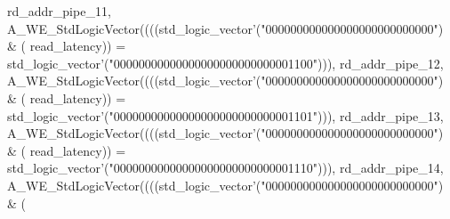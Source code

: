 \begin{DoxyCode}
{      rd_addr_pipe_11}\textcolor{vhdlchar}{,} \textcolor{vhdlchar}{A\_WE\_StdLogicVector}\textcolor{vhdlchar}{(}\textcolor{vhdlchar}{(}\textcolor{vhdlchar}{(}\textcolor{vhdlchar}{(}\textcolor{comment}{std\_logic\_vector}\textcolor{vhdlchar}{'}\textcolor{vhdlchar}{(}\textcolor{vhdllogic}{"000000000000000000000000000"}\textcolor{vhdlchar}{)} \textcolor{vhdlchar}{&} \textcolor{vhdlchar}{(}\textcolor{vhdlchar}{
      read_latency}\textcolor{vhdlchar}{)}\textcolor{vhdlchar}{)} \textcolor{vhdlchar}{=} \textcolor{comment}{std\_logic\_vector}\textcolor{vhdlchar}{'}\textcolor{vhdlchar}{(}\textcolor{vhdllogic}{"00000000000000000000000000001100"}\textcolor{vhdlchar}{)}\textcolor{vhdlchar}{)}\textcolor{vhdlchar}{)}\textcolor{vhdlchar}{,} \textcolor{vhdlchar}{
      rd_addr_pipe_12}\textcolor{vhdlchar}{,} \textcolor{vhdlchar}{A\_WE\_StdLogicVector}\textcolor{vhdlchar}{(}\textcolor{vhdlchar}{(}\textcolor{vhdlchar}{(}\textcolor{vhdlchar}{(}\textcolor{comment}{std\_logic\_vector}\textcolor{vhdlchar}{'}\textcolor{vhdlchar}{(}\textcolor{vhdllogic}{"000000000000000000000000000"}\textcolor{vhdlchar}{)} \textcolor{vhdlchar}{&} \textcolor{vhdlchar}{(}\textcolor{vhdlchar}{
      read_latency}\textcolor{vhdlchar}{)}\textcolor{vhdlchar}{)} \textcolor{vhdlchar}{=} \textcolor{comment}{std\_logic\_vector}\textcolor{vhdlchar}{'}\textcolor{vhdlchar}{(}\textcolor{vhdllogic}{"00000000000000000000000000001101"}\textcolor{vhdlchar}{)}\textcolor{vhdlchar}{)}\textcolor{vhdlchar}{)}\textcolor{vhdlchar}{,} \textcolor{vhdlchar}{
      rd_addr_pipe_13}\textcolor{vhdlchar}{,} \textcolor{vhdlchar}{A\_WE\_StdLogicVector}\textcolor{vhdlchar}{(}\textcolor{vhdlchar}{(}\textcolor{vhdlchar}{(}\textcolor{vhdlchar}{(}\textcolor{comment}{std\_logic\_vector}\textcolor{vhdlchar}{'}\textcolor{vhdlchar}{(}\textcolor{vhdllogic}{"000000000000000000000000000"}\textcolor{vhdlchar}{)} \textcolor{vhdlchar}{&} \textcolor{vhdlchar}{(}\textcolor{vhdlchar}{
      read_latency}\textcolor{vhdlchar}{)}\textcolor{vhdlchar}{)} \textcolor{vhdlchar}{=} \textcolor{comment}{std\_logic\_vector}\textcolor{vhdlchar}{'}\textcolor{vhdlchar}{(}\textcolor{vhdllogic}{"00000000000000000000000000001110"}\textcolor{vhdlchar}{)}\textcolor{vhdlchar}{)}\textcolor{vhdlchar}{)}\textcolor{vhdlchar}{,} \textcolor{vhdlchar}{
      rd_addr_pipe_14}\textcolor{vhdlchar}{,} \textcolor{vhdlchar}{A\_WE\_StdLogicVector}\textcolor{vhdlchar}{(}\textcolor{vhdlchar}{(}\textcolor{vhdlchar}{(}\textcolor{vhdlchar}{(}\textcolor{comment}{std\_logic\_vector}\textcolor{vhdlchar}{'}\textcolor{vhdlchar}{(}\textcolor{vhdllogic}{"000000000000000000000000000"}\textcolor{vhdlchar}{)} \textcolor{vhdlchar}{&} \textcolor{vhdlchar}{(}\textcolor{vhdlchar}{
}
\end{DoxyCode}
